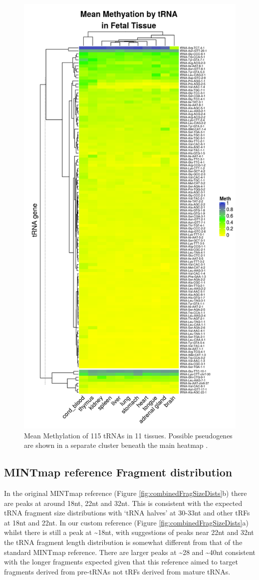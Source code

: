 \documentclass[]{book}
\begin{document}
\begin{figure}

{\centering \includegraphics[width=0.6\linewidth]{./figs/meanMethBytRNAByFetalTissueHeatmapPseudosplit} 

}

\caption{Mean Methylation of 115 tRNAs in 11 tissues. Possible pseudogenes are shown in a separate cluster beneath the main heatmap \citep{Gu2016}.}\label{fig:meanMethBytRNAByFetalTissueHeatmap}
\end{figure}



\hypertarget{mintmap-reference-fragment-distribution}{%
\subsection{MINTmap reference Fragment distribution}\label{mintmap-reference-fragment-distribution}}

In the original MINTmap reference (Figure \ref{fig:combinedFragSizeDists}b) there are peaks at around 18nt, 22nt and 32nt.
This is consistent with the expected tRNA fragment size distributions with `tRNA halves' at 30-33nt and other tRFs at 18nt and 22nt.
In our custom reference (Figure \ref{fig:combinedFragSizeDists}a) whilst there is still a peak at \textasciitilde18nt, with suggestions of peaks near 22nt and 32nt the tRNA fragment length distribution is somewhat different from that of the standard MINTmap reference.
There are larger peaks at \textasciitilde28 and \textasciitilde40nt consistent with the longer fragments expected given that this reference aimed to target fragments derived from pre-tRNAs not tRFs derived from mature tRNAs.
\end{document}
